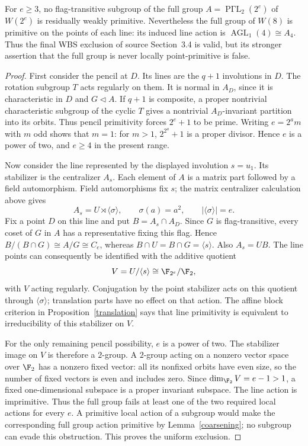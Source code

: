 \begin{theorem}
\label{wbs-exclusion}
For $e\geq3$, no flag-transitive subgroup of the full group
$A=\operatorname{P\Gamma L}_2(2^e)$ of $W(2^e)$ is residually weakly
primitive. Nevertheless the full group of $W(8)$ is primitive on the points
of each line: its induced line action is $\operatorname{AGL}_1(4)\cong A_4$.
Thus the final WBS exclusion of source Section~3.4 is valid, but its stronger
assertion that the full group is never locally point-primitive is false.
\end{theorem}
\begin{proof}
First consider the pencil at $D$. Its lines are the $q+1$ involutions in
$D$. The rotation subgroup $T$ acts regularly on them. It is normal in
$A_D$, since it is characteristic in $D$ and $G\lhd A$. If $q+1$ is
composite, a proper nontrivial characteristic subgroup of the cyclic $T$
gives a nontrivial $A_D$-invariant partition into its orbits. Thus pencil
primitivity forces $2^e+1$ to be prime. Writing $e=2^a m$ with $m$ odd
shows that $m=1$: for $m>1$, $2^{2^a}+1$ is a proper divisor. Hence
$e$ is a power of two, and $e\geq4$ in the present range.

Now consider the line represented by the displayed involution $s=u_1$.
Its stabilizer is the centralizer $A_s$. Each element of $A$ is a matrix
part followed by a field automorphism. Field automorphisms fix $s$;
the matrix centralizer calculation above gives
\[
 A_s=U\rtimes\langle\sigma\rangle,
 \qquad \sigma(a)=a^2,\qquad |\langle\sigma\rangle|=e.
\]
Fix a point $D$ on this line and put $B=A_s\cap A_D$.
Since $G$ is flag-transitive, every coset of $G$ in $A$ has a representative
fixing this flag. Hence $B/(B\cap G)\cong A/G\cong C_e$, whereas
$B\cap U=B\cap G=\langle s\rangle$. Also $A_s=UB$.
The line points can consequently be identified with the additive quotient
\[
 V=U/\langle s\rangle\cong\F_{2^e}/\F_2,
\]
with $V$ acting regularly. Conjugation by the point stabilizer acts on this
quotient through $\langle\sigma\rangle$; translation parts have no effect
on that action. The affine block criterion in
Proposition~\ref{translation} says that line primitivity is equivalent to
irreducibility of this stabilizer on $V$.

For the only remaining pencil possibility, $e$ is a power of two. The
stabilizer image on $V$ is therefore a $2$-group. A $2$-group acting on a
nonzero vector space over $\F_2$ has a nonzero fixed vector: all its nonfixed
orbits have even size, so the number of fixed vectors is even and includes
zero. Since $\dim_{\F_2}V=e-1>1$, a fixed one-dimensional subspace is a
proper invariant subspace. The line action is imprimitive. Thus the full
group fails at least one of the two required local actions for every $e$.
A primitive local action of a subgroup would make the corresponding full
group action primitive by Lemma~\ref{coarsening}; no subgroup can evade
this obstruction. This proves the uniform exclusion.


\end{proof}
